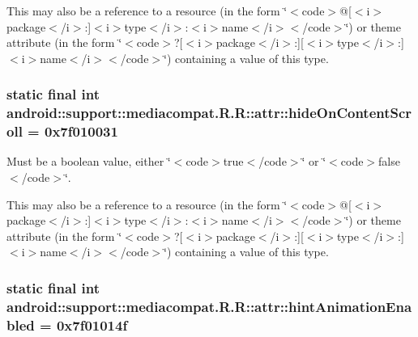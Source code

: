 This may also be a reference to a resource (in the form \char`\"{}$<$code$>$@\mbox{[}$<$i$>$package$<$/i$>$:\mbox{]}$<$i$>$type$<$/i$>$:$<$i$>$name$<$/i$>$$<$/code$>$\char`\"{}) or theme attribute (in the form \char`\"{}$<$code$>$?\mbox{[}$<$i$>$package$<$/i$>$:\mbox{]}\mbox{[}$<$i$>$type$<$/i$>$:\mbox{]}$<$i$>$name$<$/i$>$$<$/code$>$\char`\"{}) containing a value of this type. \hypertarget{classandroid_1_1support_1_1mediacompat_1_1_r_1_1attr_5c53bb2ad5cda2510371521ee677b308}{
\subsubsection[{hideOnContentScroll}]{\setlength{\rightskip}{0pt plus 5cm}static final int android::support::mediacompat.R.R::attr::hideOnContentScroll = 0x7f010031}}
\label{classandroid_1_1support_1_1mediacompat_1_1_r_1_1attr_5c53bb2ad5cda2510371521ee677b308}


Must be a boolean value, either \char`\"{}$<$code$>$true$<$/code$>$\char`\"{} or \char`\"{}$<$code$>$false$<$/code$>$\char`\"{}. 

This may also be a reference to a resource (in the form \char`\"{}$<$code$>$@\mbox{[}$<$i$>$package$<$/i$>$:\mbox{]}$<$i$>$type$<$/i$>$:$<$i$>$name$<$/i$>$$<$/code$>$\char`\"{}) or theme attribute (in the form \char`\"{}$<$code$>$?\mbox{[}$<$i$>$package$<$/i$>$:\mbox{]}\mbox{[}$<$i$>$type$<$/i$>$:\mbox{]}$<$i$>$name$<$/i$>$$<$/code$>$\char`\"{}) containing a value of this type. \hypertarget{classandroid_1_1support_1_1mediacompat_1_1_r_1_1attr_106cee13edf09de09a3254317b3d7032}{
\subsubsection[{hintAnimationEnabled}]{\setlength{\rightskip}{0pt plus 5cm}static final int android::support::mediacompat.R.R::attr::hintAnimationEnabled = 0x7f01014f}}
\label{classandroid_1_1support_1_1mediacompat_1_1_r_1_1attr_106cee13edf09de09a3254317b3d7032}


